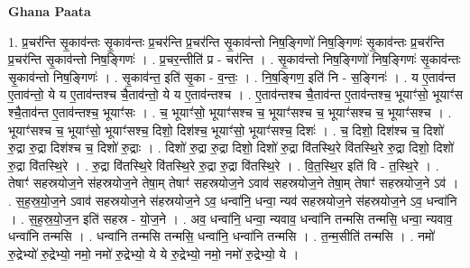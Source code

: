 \documentclass[17pt]{extarticle}
\begin{document}
\textbf{Ghana Paata } \newline

1. प्र॒चर॑न्ति सृ॒काव॑न्तः सृ॒काव॑न्तः प्र॒चर॑न्ति प्र॒चर॑न्ति सृ॒काव॑न्तो निष॒ङ्गिणो॑ निष॒ङ्गिणः॑ सृ॒काव॑न्तः प्र॒चर॑न्ति प्र॒चर॑न्ति सृ॒काव॑न्तो निष॒ङ्गिणः॑ । . प्र॒चर॒न्तीति॑ प्र - चर॑न्ति । . सृ॒काव॑न्तो निष॒ङ्गिणो॑ निष॒ङ्गिणः॑ सृ॒काव॑न्तः सृ॒काव॑न्तो निष॒ङ्गिणः॑ । . सृ॒काव॑न्त॒ इति॑ सृ॒का - व॒न्तः॒ । . नि॒ष॒ङ्गिण॒ इति॑ नि - स॒ङ्गिनः॑ । . य ए॒ताव॑न्त ए॒ताव॑न्तो॒ ये य ए॒ताव॑न्तश्च चै॒ताव॑न्तो॒ ये य ए॒ताव॑न्तश्च । . ए॒ताव॑न्तश्च चै॒ताव॑न्त ए॒ताव॑न्तश्च॒ भूयाꣳ॑सो॒ भूयाꣳ॑स श्चै॒ताव॑न्त ए॒ताव॑न्तश्च॒ भूयाꣳ॑सः । . च॒ भूयाꣳ॑सो॒ भूयाꣳ॑सश्च च॒ भूयाꣳ॑सश्च च॒ भूयाꣳ॑सश्च च॒ भूयाꣳ॑सश्च । . भूयाꣳ॑सश्च च॒ भूयाꣳ॑सो॒ भूयाꣳ॑सश्च॒ दिशो॒ दिश॑श्च॒ भूयाꣳ॑सो॒ भूयाꣳ॑सश्च॒ दिशः॑ । . च॒ दिशो॒ दिश॑श्च च॒ दिशो॑ रु॒द्रा रु॒द्रा दिश॑श्च च॒ दिशो॑ रु॒द्राः । . दिशो॑ रु॒द्रा रु॒द्रा दिशो॒ दिशो॑ रु॒द्रा वि॑तस्थि॒रे वि॑तस्थि॒रे रु॒द्रा दिशो॒ दिशो॑ रु॒द्रा वि॑तस्थि॒रे । . रु॒द्रा वि॑तस्थि॒रे वि॑तस्थि॒रे रु॒द्रा रु॒द्रा वि॑तस्थि॒रे । . वि॒त॒स्थि॒र इति॑ वि - त॒स्थि॒रे । . तेषाꣳ॑ सहस्रयोज॒ने स॑हस्रयोज॒ने तेषा॒म् तेषाꣳ॑ सहस्रयोज॒ने ऽवाव॑ सहस्रयोज॒ने तेषा॒म् तेषाꣳ॑ सहस्रयोज॒ने ऽव॑ । . स॒ह॒स्र॒यो॒ज॒ने ऽवाव॑ सहस्रयोज॒ने स॑हस्रयोज॒ने ऽव॒ धन्वा॑नि॒ धन्वा॒ न्यव॑ सहस्रयोज॒ने स॑हस्रयोज॒ने ऽव॒ धन्वा॑नि । . स॒ह॒स्र॒यो॒ज॒न इति॑ सहस्र - यो॒ज॒ने । . अव॒ धन्वा॑नि॒ धन्वा॒ न्यवाव॒ धन्वा॑नि तन्मसि तन्मसि॒ धन्वा॒ न्यवाव॒ धन्वा॑नि तन्मसि । . धन्वा॑नि तन्मसि तन्मसि॒ धन्वा॑नि॒ धन्वा॑नि तन्मसि । . त॒न्म॒सीति॑ तन्मसि । . नमो॑ रु॒द्रेभ्यो॑ रु॒द्रेभ्यो॒ नमो॒ नमो॑ रु॒द्रेभ्यो॒ ये ये रु॒द्रेभ्यो॒ नमो॒ नमो॑ रु॒द्रेभ्यो॒ ये । \newline
\end{document}
